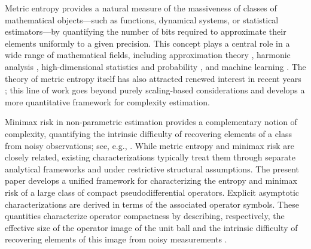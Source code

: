 \documentclass[a4paper,12pt]{article}
\begin{document}
Metric entropy provides a natural measure of the massiveness of classes of mathematical objects—such as functions, dynamical systems, or statistical estimators—by quantifying the number of bits required to approximate their elements uniformly to a given precision. 
This concept plays a central role in a wide range of mathematical fields, including approximation theory \cite{lorentzApproximationFunctions1966,lorentzMetricEntropyApproximation1966,lorentzConstructiveApproximationAdvanced1996,cohenTreeApproximationOptimal2001, cohen2022optimal}, 
harmonic analysis \cite{donohoUnconditionalBasesAre1993,donohoUnconditionalBasesBitLevel1996,donohoDataCompressionHarmonic1998,Grohs2015},
high-dimensional statistics and probability \cite{Vershynin_2018,wainwrightHighDimensionalStatistics2019}, 
and machine learning \cite{elbrachterDeepNeuralNetwork2021,hutterMetricEntropyLimits2022,20.500.11850/734099}. The theory of
metric entropy itself has also attracted renewed interest in recent years  \cite{expdecaypaper,polydecaypaper,ab2025compactoperators,allard2025metricentropyminimaxrisk,20.500.11850/734099}; this line of work goes beyond purely scaling-based considerations and develops a more quantitative framework for complexity estimation.

Minimax risk in non-parametric estimation provides a complementary notion of complexity, quantifying the intrinsic difficulty of recovering elements of a class from noisy observations; see, e.g., \cite{tsybakovIntroductionNonparametricEstimation2009,johnstone2019estimation,nussbaum1999minimax}. While metric entropy and minimax risk are closely related, existing characterizations typically treat them through separate analytical frameworks and under restrictive structural assumptions. The present paper develops a unified framework for characterizing the 
entropy and minimax risk of a large class of compact pseudodifferential operators. Explicit asymptotic characterizations are derived in terms of the associated operator symbols. These quantities characterize operator compactness by describing, respectively, the effective size of the operator image of the unit ball and the intrinsic difficulty of recovering elements of this image from noisy measurements \cite{ab2025compactoperators,allard2025metricentropyminimaxrisk}. 
\end{document}
